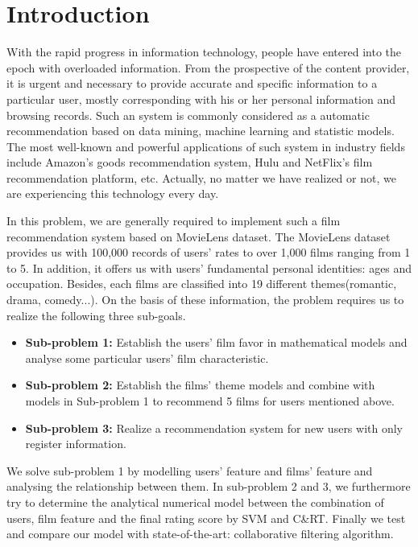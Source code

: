
\section{Introduction}
With the rapid progress in information technology, people have entered into the epoch with overloaded information. From the prospective of the content provider, it is urgent and necessary to provide accurate and specific information to a particular user, mostly corresponding with his or her personal information and browsing records. Such an system is commonly considered as a automatic recommendation based on data mining, machine learning and statistic models\cite{adomavicius2005toward}. The most well-known and powerful applications of such system in industry fields include Amazon's goods recommendation system\cite{linden2003amazon}, Hulu\cite{bennett2007netflix} and NetFlix's\cite{zheng2010clicks} film recommendation platform, etc. Actually, no matter we have realized or not, we are experiencing this technology every day. 

In this problem, we are generally required to implement such a film recommendation system based on MovieLens \cite{miller2003movielens} dataset. The MovieLens dataset provides us with 100,000 records of users' rates to over 1,000 films ranging from 1 to 5. In addition, it offers us with users' fundamental personal identities: ages and occupation. Besides, each films are classified into 19 different themes(romantic, drama, comedy...). On the basis of these information, the problem requires us to realize the following three sub-goals.
\begin{itemize}
\item \textbf{Sub-problem 1:} Establish the users' film favor in mathematical models and analyse some particular users' film characteristic. 
\item \textbf{Sub-problem 2:} Establish the films' theme models and combine with models in Sub-problem 1 to recommend 5 films for users mentioned above.  
\item\textbf{ Sub-problem 3:} Realize a recommendation system for new users with only register information.
\end{itemize} 

We solve sub-problem 1 by modelling users' feature and films' feature and analysing the relationship between them. In sub-problem 2 and 3, we furthermore try to determine the analytical numerical model between the combination of users, film feature and the final rating score by SVM and C\&RT\cite{lewis2000introduction}. Finally we test and compare our model with state-of-the-art: collaborative filtering algorithm.

